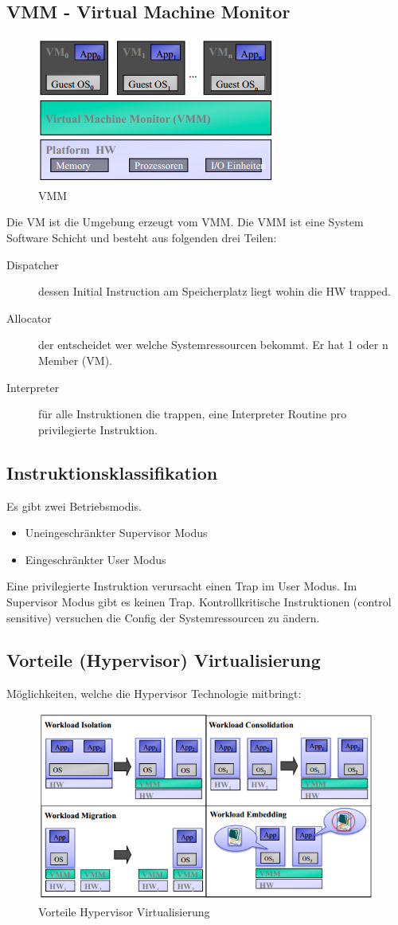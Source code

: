 \subsection{VMM - Virtual Machine Monitor}
\label{sec:vmm-virtual-machine-monitor}
\begin{figure}[h!]
	\centering
	\includegraphics[width=0.4\linewidth]{fig/vmm}
	\caption{VMM}
	\label{fig:vmm}
\end{figure}
Die VM ist die Umgebung erzeugt vom VMM. Die VMM ist eine System Software Schicht und besteht aus folgenden drei Teilen:
\begin{description}
	\item[Dispatcher] dessen Initial Instruction am Speicherplatz liegt wohin die HW trapped.
	\item[Allocator] der entscheidet wer welche Systemressourcen bekommt. Er hat 1 oder n Member (VM).
	\item[Interpreter] für alle Instruktionen die trappen, eine Interpreter Routine pro privilegierte Instruktion.
\end{description}

\subsection{Instruktionsklassifikation}
Es gibt zwei Betriebsmodis.
\begin{itemize}
	\item Uneingeschränkter Supervisor Modus
	\item Eingeschränkter User Modus
\end{itemize}
Eine privilegierte Instruktion verursacht einen Trap im User Modus. Im Supervisor Modus gibt es keinen Trap. Kontrollkritische Instruktionen (control sensitive) versuchen die Config der Systemressourcen zu ändern.

\subsection{Vorteile (Hypervisor) Virtualisierung}
Möglichkeiten, welche die Hypervisor Technologie mitbringt:
\begin{figure}[h!]
\centering
\includegraphics[width=0.7\linewidth]{fig/vorteile-hypervisor-virtualisierung}
\caption{Vorteile Hypervisor Virtualisierung}
\label{fig:vorteile-hypervisor-virtualisierung}
\end{figure}


